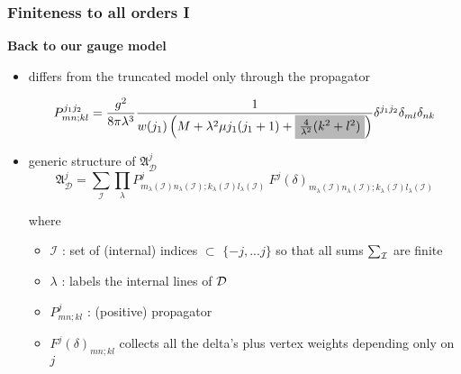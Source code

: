 \documentclass[9pt]{beamer}
\begin{document}

\begin{frame}

\frametitle{Finiteness to all orders I}

\textbf{Back to our gauge model}

\begin{itemize}
\item differs from the truncated model only through the propagator

\begin{equation*}
P^{j_1j_2}_{mn;kl} = \frac{g^2}{8\pi\lambda^3} \frac{1}{w(j_1)\left(M+\lambda^2\mu j_1(j_1+1)+
\tikz[baseline]{\node[fill=black!28!white,anchor=base] (t1) {$\frac{4}{\lambda^2}(k^2+l^2)$};}
\right)}\delta^{j_1j_2}\delta_{ml}\delta_{nk}
\end{equation*}

\item generic structure of $\mathfrak{A}^j_{\mathcal{D}}$
%
\begin{equation*}
\mathfrak{A}^j_{\mathcal{D}} = \sum_{\mathcal{I}} \prod_\lambda P^j_{m_\lambda(\mathcal{I}) n_\lambda(\mathcal{I});k_\lambda(\mathcal{I}) l_\lambda(\mathcal{I})} \ F^j(\delta)_{m_\lambda(\mathcal{I}) n_\lambda(\mathcal{I});k_\lambda(\mathcal{I}) l_\lambda(\mathcal{I})}
\end{equation*}

where 

\begin{itemize}
\item $\mathcal{I}$ : set of (internal) indices $\subset$ $\{-j,...j\}$ so that all sums $\sum_{{\cal{I}}}$ are finite

\item $\lambda$ : labels the internal lines of ${\cal{D}}$

\item $P^j_{mn;kl}$ : (positive) propagator

\item $F^j(\delta)_{mn;kl}$ collects all the delta's plus vertex weights depending only on $j$
\end{itemize}

\end{itemize}

\end{frame}

\end{document}
